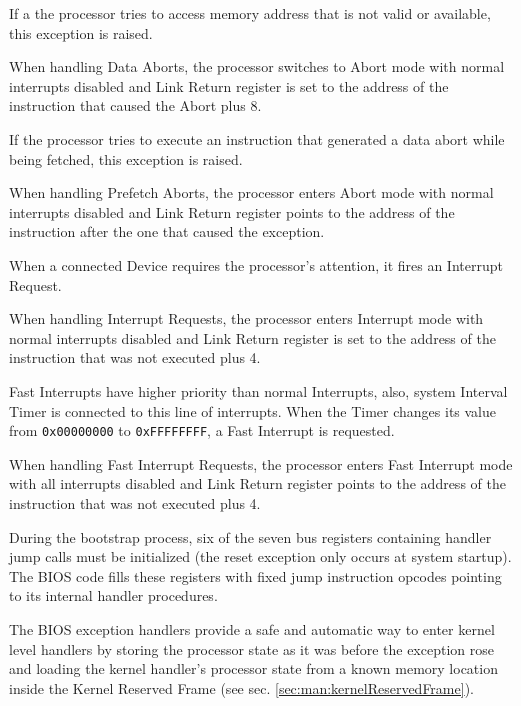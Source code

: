If a the processor tries to access memory address that is not valid or available, this exception is raised.

When handling Data Aborts, the processor switches to Abort mode with normal interrupts disabled and Link Return register is set to the address of the instruction that caused the Abort plus 8.


If the processor tries to execute an instruction that generated a data abort while being fetched, this exception is raised.

When handling Prefetch Aborts, the processor enters Abort mode with normal interrupts disabled and Link Return register points to the address of the instruction after the one that caused the exception.

When a connected Device requires the processor's attention, it fires an Interrupt Request.

When handling Interrupt Requests, the processor enters Interrupt mode with normal interrupts disabled and Link Return register is set to the address of the instruction that was not executed plus 4.

Fast Interrupts have higher priority than normal Interrupts, also, system Interval Timer is connected to this line of interrupts. When the Timer changes its value from \texttt{0x00000000} to \texttt{0xFFFFFFFF}, a Fast Interrupt is requested.

When handling Fast Interrupt Requests, the processor enters Fast Interrupt mode with all interrupts disabled and Link Return register points to the address of the instruction that was not executed plus 4.


During the bootstrap process, six of the seven bus registers containing handler jump calls must be initialized (the reset exception only occurs at system startup).
The BIOS code fills these registers with fixed jump instruction opcodes pointing to its internal handler procedures.

The BIOS exception handlers provide a safe and automatic way to enter kernel level handlers by storing the processor state as it was before the exception rose and loading the kernel handler's processor state from a known memory location inside the Kernel Reserved Frame (see sec. \ref{sec:man:kernelReservedFrame}).


